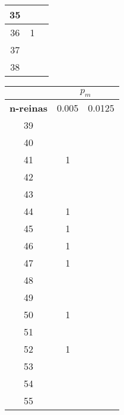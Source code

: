 \begin{figure}[H]
\begin{subfigure}{0.3\textwidth}
\begin{adjustbox}{width=\textwidth}
\begin{tabular}{|c|c|c|}
				35&\cellcolor{green!25}{0}&\cellcolor{green!25}{0}\\ \hline
				36& 1 &\cellcolor{green!25}{0}\\ \hline
				37&\cellcolor{green!25}{0}&\cellcolor{green!25}{0}\\ \hline
				38&\cellcolor{green!25}{0}&\cellcolor{green!25}{0}\\ \hline
			\end{tabular}
		\end{adjustbox}
	\end{subfigure}
	\begin{subfigure}{0.3\textwidth}
		\begin{adjustbox}{width=\textwidth} 
			\begin{tabular}{|c|c|c|}
				\hline
				\rowcolor{blue!25} & \multicolumn{2}{c|}{\textbf{$p_m$}} \\ \hline
				\rowcolor{blue!25} \textbf{n-reinas} & 0.005 & 0.0125 \\ \hline
				39&\cellcolor{green!25}{0}&\cellcolor{green!25}{0}\\ \hline
				40&\cellcolor{green!25}{0}&\cellcolor{green!25}{0}\\ \hline
				41& 1 &\cellcolor{green!25}{0}\\ \hline
				42&\cellcolor{green!25}{0}&\cellcolor{green!25}{0}\\ \hline
				43&\cellcolor{green!25}{0}&\cellcolor{green!25}{0}\\ \hline
				44& 1 &\cellcolor{green!25}{0}\\ \hline
				45& 1 &\cellcolor{green!25}{0}\\ \hline
				46& 1 &\cellcolor{green!25}{0}\\ \hline
				47& 1 &\cellcolor{green!25}{0}\\ \hline
				48&\cellcolor{green!25}{0}&\cellcolor{green!25}{0}\\ \hline
				49&\cellcolor{green!25}{0}&\cellcolor{green!25}{0}\\ \hline
				50& 1 &\cellcolor{green!25}{0}\\ \hline
				51&\cellcolor{green!25}{0}&\cellcolor{green!25}{0}\\ \hline
				52& 1 &\cellcolor{green!25}{0}\\ \hline
				53&\cellcolor{green!25}{0}&\cellcolor{green!25}{0}\\ \hline
				54&\cellcolor{green!25}{0}&\cellcolor{green!25}{0}\\ \hline
				55&\cellcolor{green!25}{0}&\cellcolor{green!25}{0}\\ \hline

\end{tabular}
\end{adjustbox}
\end{subfigure}
\end{figure}
